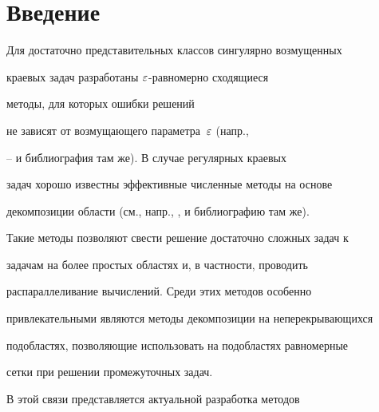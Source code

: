 \date{}




\pagestyle{plain} %







\maketitle


\label{begin}











\section{Введение}\label{section.1}





Для достаточно представительных классов сингулярно возмущенных


краевых задач разработаны $\varepsilon$-равномерно сходящиеся 


методы, для которых ошибки решений


не зависят от возмущающего параметра~$\varepsilon$ (напр.,


\cite{5}--\cite{CRC} и библиография там же). В случае регулярных краевых


задач хорошо известны эффективные численные методы на основе


декомпозиции области (см., напр., \cite{1}, \cite{18} и библиографию там же).


Такие методы позволяют свести решение достаточно сложных задач к


задачам на более простых областях и, в частности, проводить


распараллеливание вычислений. Среди этих методов особенно


привлекательными являются методы декомпозиции на неперекрывающихся


подобластях, позволяющие использовать на подобластях равномерные


сетки при решении промежуточных задач.





В этой связи представляется актуальной разработка методов


